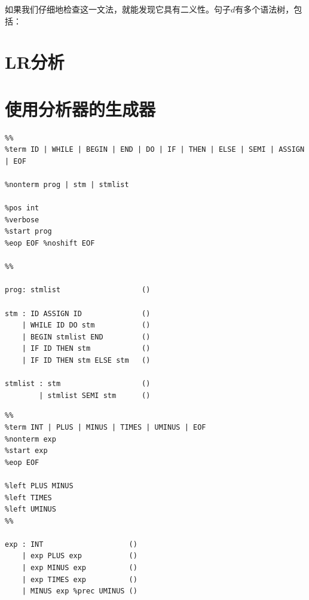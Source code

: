 \documentclass[cn,11pt,chinese]{elegantbook}
\newenvironment{code}{\captionsetup{type=listing}}{}
\begin{document}
如果我们仔细地检查这一文法，就能发现它具有二义性。句子$d$有多个语法树，包括：


\section{LR分析}

\section{使用分析器的生成器}

\begin{code}
\label{grammar:3-31}
\begin{verbatim}
%%
%term ID | WHILE | BEGIN | END | DO | IF | THEN | ELSE | SEMI | ASSIGN | EOF

%nonterm prog | stm | stmlist

%pos int
%verbose
%start prog
%eop EOF %noshift EOF

%%

prog: stmlist                   ()

stm : ID ASSIGN ID              ()
    | WHILE ID DO stm           ()
    | BEGIN stmlist END         ()
    | IF ID THEN stm            ()
    | IF ID THEN stm ELSE stm   ()

stmlist : stm                   ()
        | stmlist SEMI stm      ()
\end{verbatim}
\end{code}

\begin{code}
\label{grammar:3-35}
\begin{verbatim}
%%
%term INT | PLUS | MINUS | TIMES | UMINUS | EOF
%nonterm exp
%start exp
%eop EOF

%left PLUS MINUS
%left TIMES
%left UMINUS
%%

exp : INT                    ()
    | exp PLUS exp           ()
    | exp MINUS exp          ()
    | exp TIMES exp          ()
    | MINUS exp %prec UMINUS ()
\end{verbatim}
\end{code}
\end{document}
